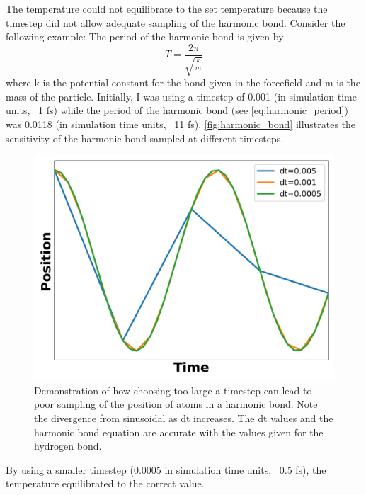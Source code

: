 The temperature could not equilibrate to the set temperature because the timestep did not allow adequate sampling of the harmonic bond.
Consider the following example:
The period of the harmonic bond is given by
\begin{equation}\label{eq:harmonic_period}
    T = \frac{2\pi}{\sqrt{\frac{k}{m}}}
\end{equation}
where k is the potential constant for the bond given in the forcefield and m is the mass of the particle.
Initially, I was using a timestep of 0.001 (in simulation time units, ~1 fs) while the period of the harmonic bond (see \autoref{eq:harmonic_period}) was 0.0118 (in simulation time units, ~11 fs). \autoref{fig:harmonic_bond} illustrates the sensitivity of the harmonic bond sampled at different timesteps.
\begin{figure}[h!]
    \centering
    \includegraphics[width=0.8\linewidth,keepaspectratio]{figures/rep_study/harmonic_bond.png}
    \caption{Demonstration of how choosing too large a timestep can lead to poor sampling of the position of atoms in a harmonic bond. Note the divergence from sinusoidal as dt increases. The dt values and the harmonic bond equation are accurate with the values given for the hydrogen bond.}\label{fig:harmonic_bond}
\end{figure}
By using a smaller timestep (0.0005 in simulation time units, ~0.5 fs), the temperature equilibrated to the correct value.
